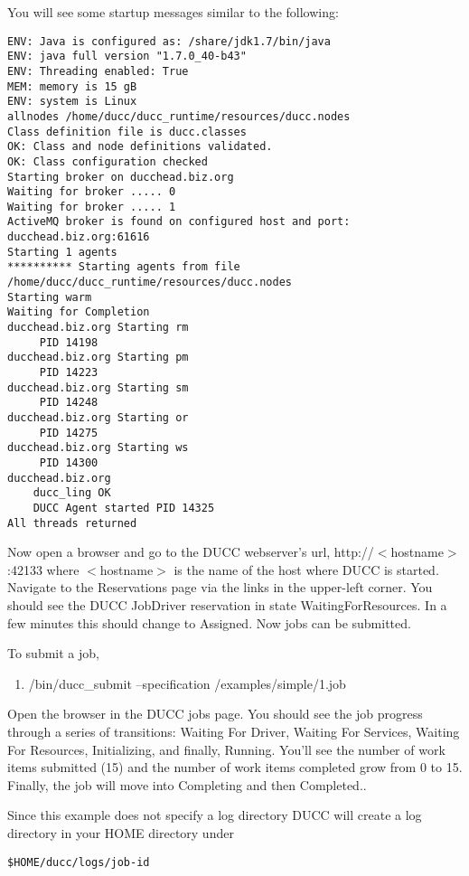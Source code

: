   You will see some startup messages similar to the following:

\begin{verbatim}
ENV: Java is configured as: /share/jdk1.7/bin/java
ENV: java full version "1.7.0_40-b43"
ENV: Threading enabled: True
MEM: memory is 15 gB
ENV: system is Linux
allnodes /home/ducc/ducc_runtime/resources/ducc.nodes
Class definition file is ducc.classes
OK: Class and node definitions validated.
OK: Class configuration checked
Starting broker on ducchead.biz.org
Waiting for broker ..... 0
Waiting for broker ..... 1
ActiveMQ broker is found on configured host and port: ducchead.biz.org:61616
Starting 1 agents
********** Starting agents from file /home/ducc/ducc_runtime/resources/ducc.nodes
Starting warm
Waiting for Completion
ducchead.biz.org Starting rm
     PID 14198
ducchead.biz.org Starting pm
     PID 14223
ducchead.biz.org Starting sm
     PID 14248
ducchead.biz.org Starting or
     PID 14275
ducchead.biz.org Starting ws
     PID 14300
ducchead.biz.org
    ducc_ling OK
    DUCC Agent started PID 14325
All threads returned
\end{verbatim}

  Now open a browser and go to the DUCC webserver's url, http://$<$hostname$>$:42133 where $<$hostname$>$ is
  the name of the host where DUCC is started.  Navigate to the Reservations page via the links in
  the upper-left corner.  You should see the DUCC JobDriver reservation in state
  WaitingForResources.  In a few minutes this should change to Assigned.
  Now jobs can be submitted.
  
  To submit a job,
  \begin{enumerate}
    \item \duccruntime/bin/ducc\_submit --specification \duccruntime/examples/simple/1.job
    \end{enumerate}
    
    Open the browser in the DUCC jobs page.  You should see the job progress through a series of
    transitions: Waiting For Driver, Waiting For Services, Waiting For Resources, Initializing, and
    finally, Running.  You'll see the number of work items submitted (15) and the number of work
    items completed grow from 0 to 15.  Finally, the job will move into Completing and then
    Completed..

    Since this example does not specify a log directory DUCC will create a log directory in your HOME directory under 
\begin{verbatim}
$HOME/ducc/logs/job-id
\end{verbatim}

